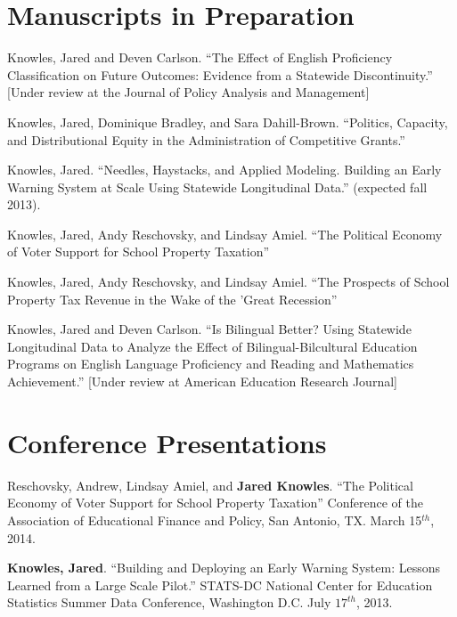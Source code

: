 \documentclass[margin,line]{res}
\begin{document}
\begin{resume}
\section{\sc Manuscripts in Preparation}

Knowles, Jared and Deven Carlson. ``The Effect of English Proficiency Classification on Future Outcomes: Evidence from a Statewide Discontinuity.'' [Under review at the 
Journal of Policy Analysis and Management]

Knowles, Jared, Dominique Bradley, and Sara Dahill-Brown. ``Politics, Capacity, and Distributional Equity in the Administration of Competitive Grants.''

Knowles, Jared. ``Needles, Haystacks, and Applied Modeling. Building an Early Warning System at Scale Using Statewide Longitudinal Data.'' (expected fall 2013). 

Knowles, Jared, Andy Reschovsky, and Lindsay Amiel. ``The Political Economy of Voter Support for School Property Taxation'' 

Knowles, Jared, Andy Reschovsky, and Lindsay Amiel. ``The Prospects of School Property Tax Revenue in the Wake of the 'Great Recession'' 

Knowles, Jared and Deven Carlson. ``Is Bilingual Better? Using Statewide Longitudinal Data to Analyze the Effect of Bilingual-Bilcultural Education Programs on English Language Proficiency and Reading and Mathematics Achievement.'' [Under review at American Education Research Journal]
% 
% 

\vspace*{5mm}

\section{\sc Conference Presentations}

Reschovsky, Andrew, Lindsay Amiel, and \textbf{Jared Knowles}. ``The Political Economy of Voter Support for School Property Taxation'' Conference of the Association of Educational Finance and Policy, San Antonio, TX. March 15$^{th}$, 2014. 

\textbf{Knowles, Jared}. ``Building and Deploying an Early Warning System: Lessons Learned from a Large Scale Pilot.'' STATS-DC National Center for Education Statistics Summer Data Conference, Washington D.C. July $17^{th}$, 2013.


\end{resume}
\end{document}
